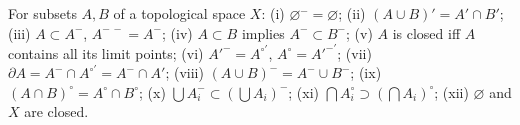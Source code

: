 For subsets $A, B$ of a topological space $X$:
(i) $\varnothing^{-} = \varnothing$;
(ii) $(A \cup B)' = A' \cap B'$;
(iii) $A \subset A^{-}$, $A^{-\,-} = A^{-}$;
(iv) $A \subset B$ implies $A^{-} \subset B^{-}$;
(v) $A$ is closed iff $A$ contains all its limit points;
(vi) $A'^{-} = A^{\circ\prime}$, $A^{\circ} = A'^{-'}$;
(vii) $\partial A = A^{-} \cap A^{\circ\prime} = A^{-} \cap A'$;
(viii) $(A \cup B)^{-} = A^{-} \cup B^{-}$;
(ix) $(A \cap B)^{\circ} = A^{\circ} \cap B^{\circ}$;
(x) $\bigcup A_i^{-} \subset (\bigcup A_i)^{-}$;
(xi) $\bigcap A_i^{\circ} \supset (\bigcap A_i)^{\circ}$;
(xii) $\varnothing$ and $X$ are closed.